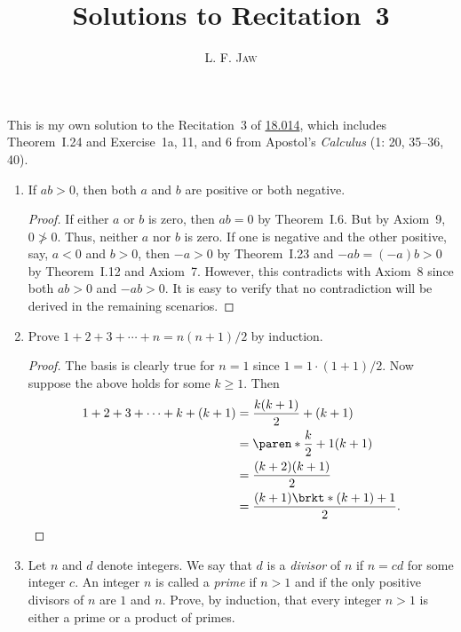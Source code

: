 \documentclass[a4paper]{article}
\title{Solutions to Recitation~3}
\author{L. F. \textsc{Jaw}}
\begin{document}
\maketitle

This is my own solution to the Recitation~3 of
\href{https://ocw.mit.edu/courses/mathematics/18-014-calculus-with-theory-fall-2010/recitations/}{18.014},
which includes Theorem~I.24 and Exercise~1a, 11, and 6 from Apostol's
\textit{Calculus} (1: 20, 35--36, 40).

\begin{enumerate}
\item If \(ab > 0\), then both \(a\) and \(b\) are positive or both
  negative.

  \begin{proof}
    If either \(a\) or \(b\) is zero, then \(ab = 0\) by Theorem~I.6.  But
    by Axiom~9, \(0 \ngtr 0\).  Thus, neither \(a\) nor \(b\) is zero.  If
    one is negative and the other positive, say, \(a < 0\) and \(b > 0\),
    then \(-a > 0\) by Theorem~I.23 and \(-ab = (-a)b > 0\) by Theorem~I.12
    and Axiom~7.  However, this contradicts with Axiom~8 since both
    \(ab > 0\) and \(-ab >0\).  It is easy to verify that no contradiction
    will be derived in the remaining scenarios.  %
  \end{proof}
  
\item Prove \(1 + 2 + 3 + \dotsb + n = n(n+1)/2 \) by induction.

  \begin{proof}
    The basis is clearly true for \(n = 1\) since \(1 = 1 \cdot (1+1)/2\).
    Now suppose the above holds for some \(k \ge 1\).  Then
    \begin{align*}
      1 + 2 + 3 + \dotsb + k + (k+1)
        &= \frac{k(k+1)}{2} + (k+1) \\
        &= \paren*{\frac{k}{2} + 1} (k+1) \\
        &= \frac{(k+2)(k+1)}{2} \\
        &= \frac{(k+1)\brkt*{(k+1)+1}}{2}. \qedhere
    \end{align*}
  \end{proof}
  
\item Let \(n\) and \(d\) denote integers.  We say that \(d\) is a
  \emph{divisor} of \(n\) if \(n = cd\) for some integer \(c\).  An
  integer \(n\) is called a \emph{prime} if \(n > 1\) and if the only
  positive divisors of \(n\) are \(1\) and \(n\).  Prove, by induction,
  that every integer \(n > 1\) is either a prime or a product of primes.


\end{enumerate}
\end{document}
